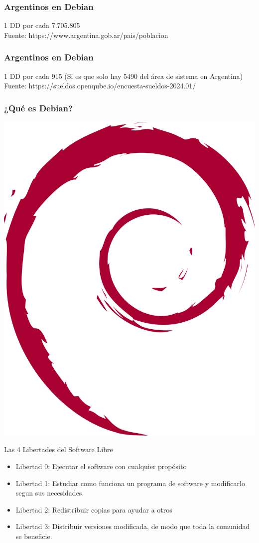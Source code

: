 \documentclass{beamer}
\begin{document}
\begin{frame}
  \frametitle{Argentinos en Debian}
  \centering
  \Huge 1 DD por cada 7.705.805
  \vspace{1cm} \\
  \tiny Fuente: https://www.argentina.gob.ar/pais/poblacion
\end{frame}

\begin{frame}
  \frametitle{Argentinos en Debian}
  \centering
  \Huge 1 DD por cada 915  (Si es que solo hay 5490 del área de sistema en
  Argentina)
  \vspace{1cm} \\
  \tiny Fuente: https://sueldos.openqube.io/encuesta-sueldos-2024.01/
\end{frame}

\begin{frame}
  \frametitle{¿Qué es Debian?}
		\includegraphics[width=0.7\linewidth]{images/debian}
\end{frame}


\begin{frame}{Las 4 Libertades del Software Libre}
  \begin{itemize}
    \item Libertad 0: Ejecutar el software con cualquier propósito \pause
    \item Libertad 1: Estudiar como funciona un programa de software y
      modificarlo segun sus necesidades. \pause
    \item Libertad 2: Redistribuir copias para ayudar a otros \pause
    \item Libertad 3: Distribuir versiones modificada, de modo que toda la
      comunidad se beneficie.
  \end{itemize}
\end{frame}
\end{document}
